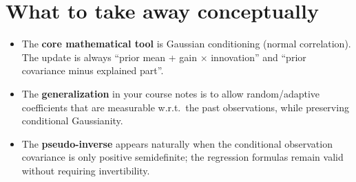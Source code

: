 \section{What to take away conceptually}

\begin{itemize}
\item The \textbf{core mathematical tool} is Gaussian conditioning (normal correlation). The update is
      always ``prior mean + gain $\times$ innovation'' and ``prior covariance minus explained part''.
\item The \textbf{generalization} in your course notes is to allow random/adaptive coefficients that are
      measurable w.r.t.\ the past observations, while preserving conditional Gaussianity.
\item The \textbf{pseudo-inverse} appears naturally when the conditional observation covariance is only
      positive semidefinite; the regression formulas remain valid without requiring invertibility.
\end{itemize}


